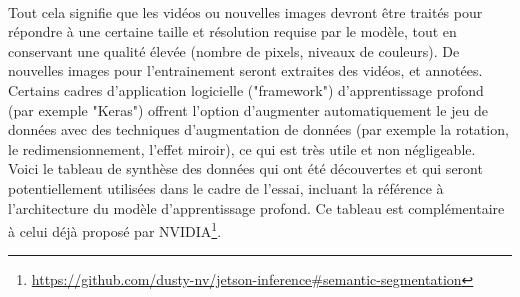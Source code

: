 \vspace{\baselineskip}
\\
\noindent Tout cela signifie que les vidéos ou nouvelles images devront être traités pour répondre à une certaine taille et résolution requise par le modèle, tout en conservant une qualité élevée (nombre de pixels, niveaux de couleurs). De nouvelles images pour l'entrainement seront extraites des vidéos, et annotées. 
\vspace{\baselineskip}
\\
\noindent Certains cadres d'application logicielle ("framework") d'apprentissage profond (par exemple "Keras") offrent l'option d'augmenter automatiquement le jeu de données avec des techniques d'augmentation de données (par exemple la rotation, le redimensionnement, l'effet miroir), ce qui est très utile et non négligeable.
\vspace{\baselineskip}
\\
\noindent Voici le tableau de synthèse des données qui ont été découvertes et qui seront potentiellement utilisées dans le cadre de l'essai, incluant la référence à l'architecture du modèle d'apprentissage profond. Ce tableau est complémentaire à celui déjà proposé par NVIDIA\footnote{\url{https://github.com/dusty-nv/jetson-inference#semantic-segmentation}}.
